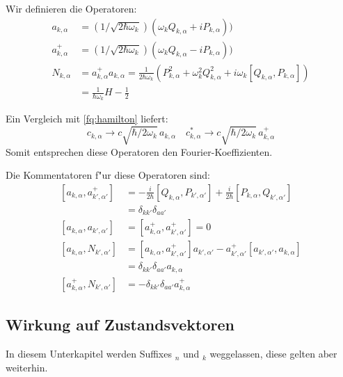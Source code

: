 Wir definieren die Operatoren:
\begin{equation}
\begin{split}
a_{k,\alpha} &= (1/\sqrt{2 \hbar \omega_k})(\omega_k Q_{k,\alpha} + iP_{k,\alpha})) \\
a^+_{k,\alpha} &= (1/\sqrt{2 \hbar \omega_k})(\omega_k Q_{k,\alpha} - iP_{k,\alpha}))\\
N_{k,\alpha} &= a^+_{k,\alpha} a_{k,\alpha} = \frac{1}{2 \hbar \omega_k} (P_{k,\alpha}^2 + \omega_k^2 Q_{k,\alpha}^2 + i\omega_k [Q_{k,\alpha},P_{k,\alpha}] ) \\
 &= \frac{1}{ \hbar \omega_k } H - \frac{1}{2}
\end{split}
\end{equation}

Ein Vergleich mit \ref{fq:hamilton} liefert:
\begin{equation} \label{fq:opp_fourier}
 c_{k,\alpha} \rightarrow c \sqrt{\hbar/2 \omega_k} \, a_{k,\alpha} \quad c^*_{k,\alpha} \rightarrow c \sqrt{\hbar/2 \omega_k} \, a^+_{k,\alpha}
\end{equation}
Somit entsprechen diese Operatoren den Fourier-Koeffizienten.

Die Kommentatoren f"ur diese Operatoren sind:
\begin{equation}
\begin{split}
[a_{k,\alpha} , a^+_{k',\alpha'}] &= - \frac{i}{2 \hbar} [Q_{k,\alpha}, P_{k',\alpha'}] + \frac{i}{2 \hbar} [P_{k,\alpha}, Q_{k',\alpha'}] \\
	 &= \delta_{kk'}\delta_{aa'} \\
[a_{k,\alpha} , a_{k',\alpha'}] &= [a^+_{k,\alpha} , a^+_{k',\alpha'}] = 0 \\
[a_{k,\alpha} , N_{k',\alpha'}] &= [a_{k,\alpha} , a^+_{k',\alpha'}]a_{k',\alpha'} - a^+_{k',\alpha'}[a_{k',\alpha'} , a_{k,\alpha}]\\
	&= \delta_{kk'}\delta_{aa'} a_{k,\alpha} \\
[a^+_{k,\alpha} , N_{k',\alpha'}] &= -\delta_{kk'}\delta_{aa'} a^+_{k,\alpha}
\end{split}
\end{equation}

\subsection{Wirkung auf Zustandsvektoren}

In diesem Unterkapitel werden Suffixes $_n$ und $_k$ weggelassen, diese gelten aber weiterhin. 

